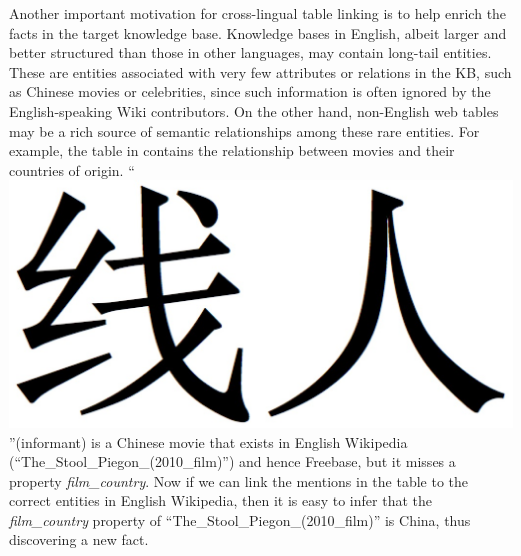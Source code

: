 Another important motivation for cross-lingual table linking is to 
help enrich the facts in the target knowledge base. 
Knowledge bases in English,  albeit larger and better structured than those in other languages,
may contain long-tail entities. These are entities associated with very few attributes 
or relations in the KB, such as Chinese movies or celebrities, since such information is often
ignored by the English-speaking Wiki contributors.
On the other hand, non-English web tables may be a rich source of 
semantic relationships among these rare entities.
For example, the table in  contains the relationship between movies and
their countries of origin. ``
\includegraphics[height=1.3\fontcharht\font`\B]{figures/xianren.png} 
''(informant) is a Chinese movie that exists in English Wikipedia
(``The\_Stool\_Piegon\_(2010\_film)'') and hence Freebase, but it misses a property 
{\em film\_country}. Now if we can link the mentions in the table to the correct entities in
English Wikipedia, then it is easy to infer that the {\em film\_country} property of 
``The\_Stool\_Piegon\_(2010\_film)'' is China, thus discovering a new fact. 

